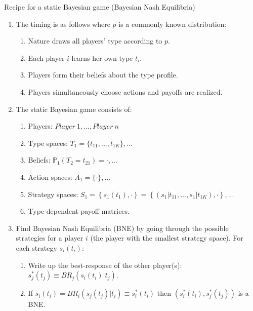 \begin{frame}{Recipe for a static Bayesian game (Bayesian Nash Equilibria)}
    \begin{enumerate}
      \item The timing is as follows where $p$ is a commonly known distribution:
      \begin{enumerate}\normalsize
        \item Nature draws all players' type according to $p$.
        \item Each player $i$ learns her own type $t_{i}$.
        \item Players form their beliefs about the type profile.
        \item Players simultaneously choose actions and payoffs are realized.
      \end{enumerate}
      \item The static Bayesian game consists of:
      \begin{enumerate}\normalsize
        \item Players: $Player\ 1,...,Player\ n$
        \item Type spaces: $T_1=\{t_{11},...,t_{1K}\},...$
        \item Beliefs: $\mathbb{P}_1(T_2=t_{21})=\cdot,...$
        \item Action spaces: $A_1=\{\cdot\},...$
        \item Strategy spaces: $S_1=\left\{s_1(t_1),\cdot\right\}=\left\{(s_1|t_{11},...,s_1|t_{1K}),\cdot\right\},...$
        \item Type-dependent payoff matrices.
      \end{enumerate}
      \item Find Bayesian Nash Equilibria (BNE) by going through the possible strategies for a player $i$ (the player with the smallest strategy space). For each strategy $s_i(t_i)$:
      \begin{enumerate}\normalsize
        \item Write up the best-response of the other player(s): $s_j^*(t_j)\equiv BR_j\left(s_i(t_i)|t_j\right)$.
        \item If $s_i(t_i)=BR_i\left(s_j(t_j)|t_i\right)\equiv s_i^*(t_i)$ then $\left(s_i^*(t_i),s_j^*(t_j)\right)$ is a BNE.
      \end{enumerate}
    \end{enumerate}
    \vfill\null
\end{frame}
